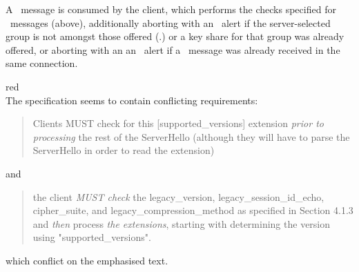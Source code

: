 A \HelloRetryRequest\ message is consumed by the client, which performs
the checks specified for \ServerHello\ messages (above), 
additionally aborting with an \TLSillegalParameter\ alert if  
the server-selected group is not amongst those offered (\ClientHello.\TLSsupportedGroups)
or a key share for that group was already offered,
or aborting with an an \TLSunexpectedMessage\ alert if a \HelloRetryRequest\
message was already received in the same connection.
%
\begin{comment}
Additional abort [due to \emph{a key share for that group was already offered}] inferred 
(possibly incorrectly) from: 
\begin{quote}
  Clients MUST abort the handshake with an "illegal_parameter" 
  alert if the HelloRetryRequest would not result in any change 
  in the ClientHello.
\end{quote}
A change is required if key shares (plural) were offered in the Client Hello Message. (Those key 
shares must be replaced by a single key share.) I suspect the spec meant  "would not result in a
meaningful change," e.g., when a key share for the server-selected group was already offered.

Actually, this is made explicit later in the specification:
\begin{quote}
  the client MUST verify that...the selected_group field does not
  correspond to a group which was provided in the "key_share" extension
  in the original ClientHello. If [the check] fails, then the client MUST 
  abort the handshake with an "illegal_parameter" alert.
\end{quote}
\end{comment}
%
\ifSpecNotes
\begin{color}{red}\\
The specification seems to contain conflicting requirements: 
\begin{quote}
  Clients MUST check for this [supported_versions] extension \emph{prior to
  processing} the rest of the ServerHello (although they will have to           
  parse the ServerHello in order to read the extension)
\end{quote}
and
\begin{quote}
   the client \emph{MUST check} the
   legacy_version, legacy_session_id_echo, cipher_suite, and
   legacy_compression_method as specified in Section 4.1.3 and \emph{then}
   process \emph{the extensions}, starting with determining the version using          
   "supported_versions".
\end{quote}
which conflict on the emphasised text. 
\end{color}
